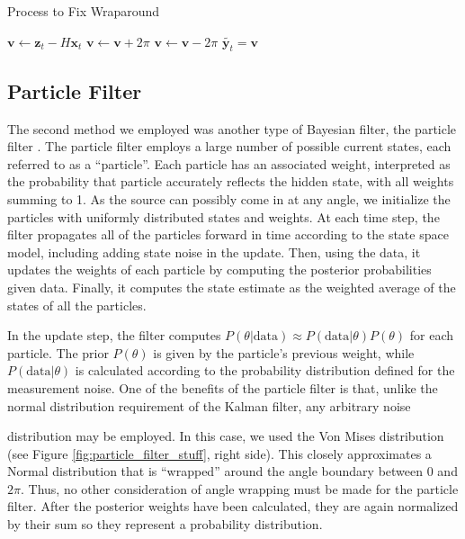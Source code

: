 \documentclass[11pt]{amsart}
\begin{document}
\begin{algorithm}
    \caption{Process to Fix Wraparound}\label{alg:kalman}    
    \begin{algorithmic}
        \State $\mathbf{v} \gets \mathbf{z}_t - H\mathbf{x}_t$
            \State $\mathbf{v} \gets \mathbf{v} + 2\pi$
            \State $\mathbf{v} \gets \mathbf{v} - 2\pi$
        \EndIf 
        \State $\tilde{\mathbf{y}_t} = \mathbf{v}$ 
        \end{algorithmic}
    \end{algorithm}


\subsection{Particle Filter}
The second method we employed was another type of Bayesian filter, the particle filter \cite{Particle}. The particle filter employs a large number of possible current states, each referred to 
as a “particle”. Each particle has an associated weight, interpreted as the probability that particle accurately reflects the hidden state, with all weights summing to 1. As the source can possibly 
come in at any angle, we initialize the particles with uniformly distributed states and weights. At each time step, the filter propagates all of the particles forward in time according to the state space 
model, including adding state noise in the update. Then, using the data, it updates the weights of each particle by computing the posterior probabilities given data. Finally, it computes the state estimate 
as the weighted average of the states of all the particles. 

In the update step, the filter computes $P(\theta|\text{data}) \approx P(\text{data}|\theta)P(\theta)$ for each particle. The prior $P(\theta)$ is given by the particle’s previous weight, while $P(\text{data}|\theta)$ is calculated 
according to the probability distribution defined for the measurement noise. One of the benefits of the particle filter is that, unlike the normal distribution requirement of the Kalman filter, any arbitrary noise 

distribution may be employed. In this case, we used the Von Mises distribution (see Figure \ref{fig:particle_filter_stuff}, right side). This closely approximates a Normal distribution 
that is “wrapped” around the angle boundary between $0$ and $2\pi$. Thus, no other consideration of angle wrapping must be made for the particle filter. After the posterior weights have been calculated, they are again normalized by 
their sum so they represent a probability distribution.
\end{document}
